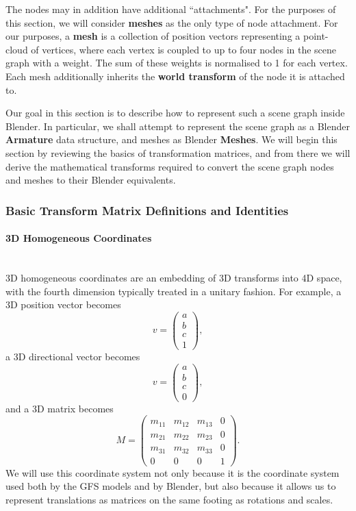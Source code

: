 \documentclass{article}
\begin{document}
The nodes may in addition have additional ``attachments". For the purposes of this section, we will consider \textbf{meshes} as the only type of node attachment. For our purposes, a \textbf{mesh} is a collection of position vectors representing a point-cloud of vertices, where each vertex is coupled to up to four nodes in the scene graph with a weight. The sum of these weights is normalised to 1 for each vertex. Each mesh additionally inherits the \textbf{world transform} of the node it is attached to.

Our goal in this section is to describe how to represent such a scene graph inside Blender. In particular, we shall attempt to represent the scene graph as a Blender \textbf{Armature} data structure, and meshes as Blender \textbf{Meshes}. We will begin this section by reviewing the basics of transformation matrices, and from there we will derive the mathematical transforms required to convert the scene graph nodes and meshes to their Blender equivalents.


\subsubsection{Basic Transform Matrix Definitions and Identities}
\paragraph{3D Homogeneous Coordinates}\mbox{}\\
3D homogeneous coordinates are an embedding of 3D transforms into 4D space, with the fourth dimension typically treated in a unitary fashion. For example, a 3D position vector becomes
\begin{equation}
v = \begin{pmatrix}
a\\
b\\
c\\
1
\end{pmatrix},
\end{equation}
a 3D directional vector becomes
\begin{equation}
v = \begin{pmatrix}
a\\
b\\
c\\
0
\end{pmatrix},
\end{equation}
and a 3D matrix becomes
\begin{equation}
M =
\begin{pmatrix}
m_{11} & m_{12} & m_{13} & 0\\
m_{21} & m_{22} & m_{23} & 0\\
m_{31} & m_{32} & m_{33} & 0\\
0 & 0 & 0 & 1
\end{pmatrix}.
\end{equation}
We will use this coordinate system not only because it is the coordinate system used both by the GFS models and by Blender, but also because it allows us to represent translations as matrices on the same footing as rotations and scales.
\end{document}
